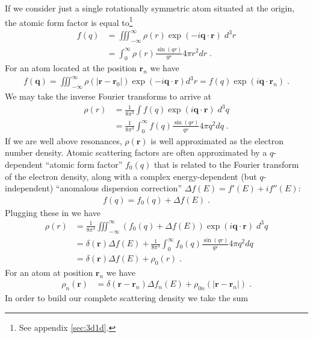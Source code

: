 \documentclass[11pt]{article}
\renewcommand{\vec}[1]{\boldsymbol{#1}}
\begin{document}
If we consider just a single rotationally symmetric atom situated at the origin, the atomic form factor is equal to\footnote{See appendix \ref{sec:3d1d}.}
\begin{align}
f(q)  &= \iiint_{-\infty}^\infty \rho(r) \exp(-i \vec{q}\cdot\vec{r}) \; d^3r \\
  &= \int_0^\infty \rho(r)   \frac{\sin(qr)}{qr}  4\pi r^2 dr \; . \label{eqn:form}
\end{align}
For an atom located at the position $\vec{r}_n$ we have
\begin{align}
f(\vec{q})  = \iiint_{-\infty}^\infty \rho(|\vec{r}-\vec{r}_0|) \exp(-i \vec{q}\cdot\vec{r}) d^3r = f(q)\exp(i \vec{q}\cdot\vec{r}_n)  \; .
\end{align}
We may take the inverse Fourier transforms to arrive at %
\begin{align}
\rho(r)  &= \frac{1}{8\pi^{3}} \int  f(q)  \exp(i \vec{q}\cdot\vec{r}) \; d^3q \\
&= \frac{1}{8\pi^{3}} \int_0^\infty f(q)   \frac{\sin(qr)}{qr}  4\pi q^2 dq \; . \label{rhor}
\end{align}
If we are well above resonances, $\rho(\vec{r})$ is well approximated as the electron number density.    Atomic scattering factors are often approximated by a $q$-dependent ``atomic form factor'' $f_0(q)$  that is related to the Fourier transform of the electron density, along with a complex energy-dependent (but $q$-independent) ``anomalous dispersion correction'' $\Delta f(E) =  f'(E) + i f''(E)$: 
\begin{align}
f(q) = f_0(q) + \Delta f(E) \; . %
\end{align}
Plugging these in we have
\begin{align}
\rho(r)  &= \frac{1}{8\pi^{3}} \iiint_{-\infty}^\infty  (f_0(q) + \Delta f(E))   \exp(i \vec{q}\cdot\vec{r}) \; d^3q \\
&=  \delta(\vec{r}) \Delta f(E) + \frac{1}{8\pi^{3}} \int_0^\infty f_0(q)    \frac{\sin(qr)}{qr}  4\pi q^2 dq  \\
&=  \delta(\vec{r}) \Delta f(E) + \rho_0(r) \; .
\end{align}
For an atom at position $\vec{r}_n$ we have
\begin{align}
\rho_n(\vec{r})  &=  \delta(\vec{r}-\vec{r}_n) \Delta f_n(E) + \rho_{0n}(|\vec{r}-\vec{r}_n|) \; .
\end{align}
In order to build our complete scattering density we take the sum
\end{document}
